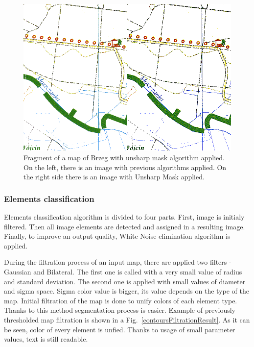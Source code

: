 \documentclass[a4paper,onecolumn,oneside,12pt]{memoir}
\begin{document}
\begin{figure}[!ht]
\begin{center}
\includegraphics[scale=0.4]{images/unsharpMaskResult.png}
\caption{Fragment of a map of Brzeg with unsharp mask algorithm applied.
On the left, there is an image with previous algorithms applied. On the right side there is an image
with Unsharp Mask applied.}
\label{unsharpMaskResult}
\end{center}
\end{figure}

\subsubsection{Elements classification}

Elements classification algorithm is divided to four parts. First, image is initialy filtered. Then
all image elements are detected and assigned in a resulting image. Finally, to improve an output
quality, White Noise elimination algorithm is applied.

During the filtration process of an input map, there are applied two filters - Gaussian and
Bilateral. The first one is called with a very small value of radius and standard deviation. The
second one is applied with small values of diameter and sigma space. Sigma color value is bigger,
its value depends on the type of the map. Initial filtration of the map is done to unify colors of
each element type. Thanks to this method segmentation process is easier. Example of previously
thresholded map filtration is shown in a Fig.~\ref{contoursFiltrationResult}. As it can be seen,
color of every element is unfied. Thanks to usage of small parameter values, text is still readable.
\end{document}
